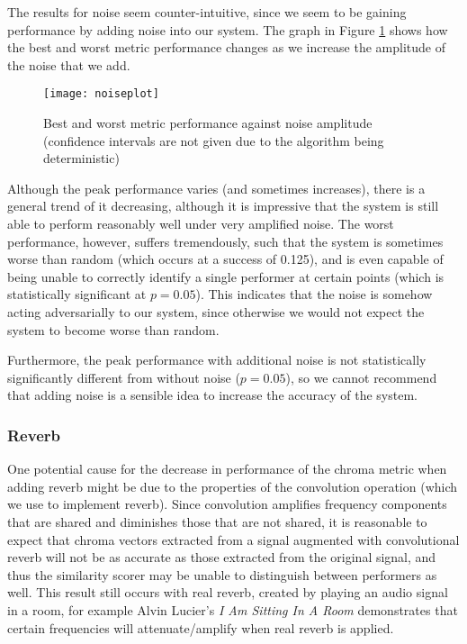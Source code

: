 \documentclass[oneside, class=book, 12pt, crop=false]{standalone}
\begin{document}
The results for noise seem counter-intuitive, since we seem to be gaining performance by adding noise into our system. The graph in Figure \ref{fig:noiseplot} shows how the best and worst metric performance changes as we increase the amplitude of the noise that we add.

\begin{figure}[h]
    \captionsetup{justification=centering}
    \centering
    \texttt{[image: noiseplot]}
    \caption{Best and worst metric performance against noise amplitude (confidence intervals are not given due to the algorithm being deterministic)}
    \label{fig:noiseplot}
\end{figure}

Although the peak performance varies (and sometimes increases), there is a general trend of it decreasing, although it is impressive that the system is still able to perform reasonably well under very amplified noise. The worst performance, however, suffers tremendously, such that the system is sometimes worse than random (which occurs at a success of 0.125), and is even capable of being unable to correctly identify a single performer at certain points (which is statistically significant at $p=0.05$). This indicates that the noise is somehow acting adversarially to our system, since otherwise we would not expect the system to become worse than random.

Furthermore, the peak performance with additional noise is not statistically significantly different from without noise ($p=0.05$), so we cannot recommend that adding noise is a sensible idea to increase the accuracy of the system.

\subsubsection{Reverb}\label{sec:reverb issues}

One potential cause for the decrease in performance of the chroma metric when adding reverb might be due to the properties of the convolution operation (which we use to implement reverb). Since convolution amplifies frequency components that are shared and diminishes those that are not shared, it is reasonable to expect that chroma vectors extracted from a signal augmented with convolutional reverb will not be as accurate as those extracted from the original signal, and thus the similarity scorer may be unable to distinguish between performers as well. This result still occurs with real reverb, created by playing an audio signal in a room, for example Alvin Lucier's \textit{I Am Sitting In A Room}\cite{alvinlucier}  demonstrates that certain frequencies will attenuate/amplify when real reverb is applied.
\end{document}
